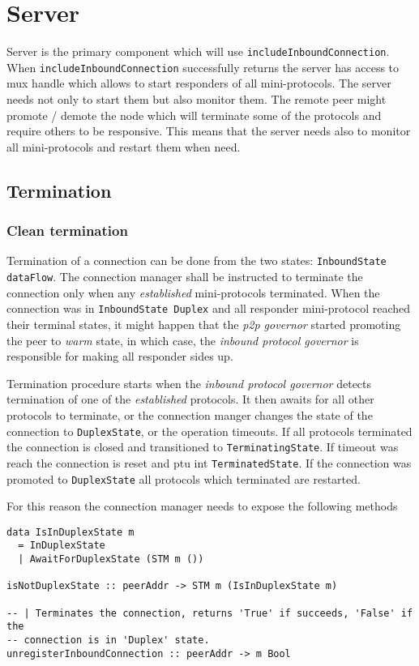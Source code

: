 \documentclass{article}
\def\DuplexState{\texttt{DuplexState}}
\def\InboundStateDup{\texttt{InboundState Duplex}}
\def\InboundStateAny{\texttt{InboundState dataFlow}}
\def\TerminatingState{\texttt{TerminatingState}}
\def\TerminatedState{\texttt{TerminatedState}}
\def\warm{\textit{warm}}
\def\established{\textit{established}}
\def\ptopgov{\textit{p2p governor}}
\def\inbgov{\textit{inbound protocol governor}}
\begin{document}
\section{Server}

Server is the primary component which will use
\texttt{includeInboundConnection}.  When \texttt{includeInboundConnection}
successfully returns the server has access to mux handle which allows to start
responders of all mini-protocols.  The server needs not only to start them but
also monitor them.  The remote peer might promote / demote the node which will
terminate some of the protocols and require others to be responsive.  This
means that the server needs also to monitor all mini-protocols and restart them
when need.

\subsection{Termination}

\subsubsection{Clean termination}
Termination of a connection can be done from
the two states: \InboundStateAny{}.  The
connection manager shall be instructed to terminate the connection only when
any \established{} mini-protocols terminated.  When the connection was in
\InboundStateDup{} and all responder mini-protocol reached their terminal
states, it might happen that the \ptopgov{} started promoting the peer to
\warm{} state, in which case, the \inbgov{} is responsible for making all
responder sides up.

Termination procedure starts when the \inbgov{} detects termination of one of
the \established{} protocols.   It then awaits for all other protocols to
terminate, or the connection manger changes the state of the connection to
\DuplexState{}, or the operation timeouts.  If all protocols terminated the
connection is closed and transitioned to
\TerminatingState{}.  If timeout was reach the connection is reset and ptu int
\TerminatedState{}.  If the connection was promoted to \DuplexState{} all
protocols which terminated are restarted.

For this reason the connection manager needs to expose the following methods
\begin{lstlisting}
data IsInDuplexState m
  = InDuplexState
  | AwaitForDuplexState (STM m ())

isNotDuplexState :: peerAddr -> STM m (IsInDuplexState m)

-- | Terminates the connection, returns 'True' if succeeds, 'False' if the
-- connection is in 'Duplex' state.
unregisterInboundConnection :: peerAddr -> m Bool
\end{lstlisting}
\end{document}
